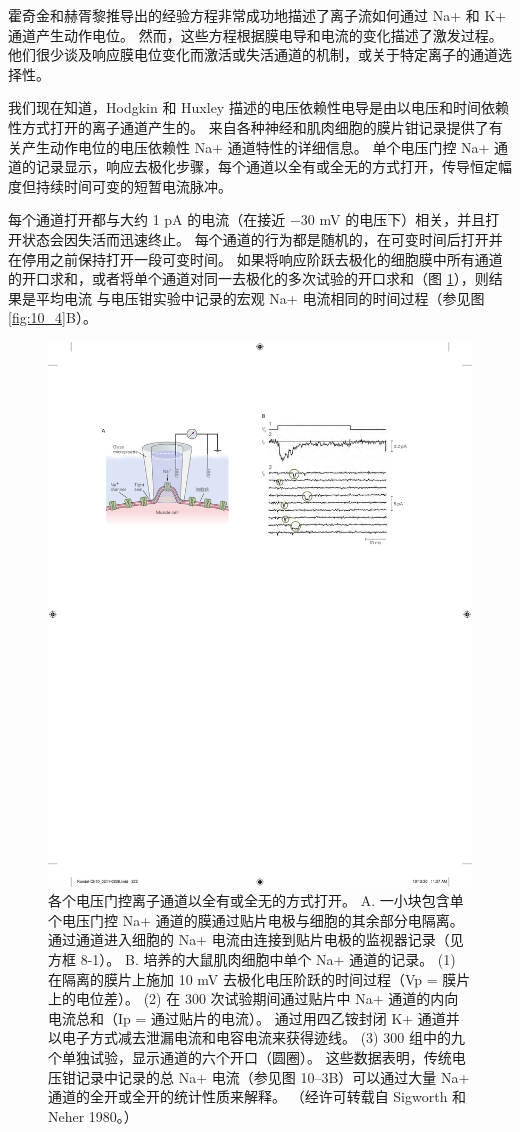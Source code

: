 霍奇金和赫胥黎推导出的经验方程非常成功地描述了离子流如何通过 Na+ 和 K+ 通道产生动作电位。 
然而，这些方程根据膜电导和电流的变化描述了激发过程。 
他们很少谈及响应膜电位变化而激活或失活通道的机制，或关于特定离子的通道选择性。


我们现在知道，Hodgkin 和 Huxley 描述的电压依赖性电导是由以电压和时间依赖性方式打开的离子通道产生的。 
来自各种神经和肌肉细胞的膜片钳记录提供了有关产生动作电位的电压依赖性 Na+ 通道特性的详细信息。 
单个电压门控 Na+ 通道的记录显示，响应去极化步骤，每个通道以全有或全无的方式打开，传导恒定幅度但持续时间可变的短暂电流脉冲。


每个通道打开都与大约 1 pA 的电流（在接近 −30 mV 的电压下）相关，并且打开状态会因失活而迅速终止。 
每个通道的行为都是随机的，在可变时间后打开并在停用之前保持打开一段可变时间。 
如果将响应阶跃去极化的细胞膜中所有通道的开口求和，或者将单个通道对同一去极化的多次试验的开口求和（图 \ref{fig:10_9}），则结果是平均电流 与电压钳实验中记录的宏观 Na+ 电流相同的时间过程（参见图 \ref{fig:10_4}B）。

\begin{figure}[htbp]
	\centering
	\includegraphics[width=0.5\linewidth]{chap10/fig_10_9}
	\caption{各个电压门控离子通道以全有或全无的方式打开。 A. 一小块包含单个电压门控 Na+ 通道的膜通过贴片电极与细胞的其余部分电隔离。 通过通道进入细胞的 Na+ 电流由连接到贴片电极的监视器记录（见方框 8-1）。 B. 培养的大鼠肌肉细胞中单个 Na+ 通道的记录。 (1) 在隔离的膜片上施加 10 mV 去极化电压阶跃的时间过程（Vp = 膜片上的电位差）。 (2) 在 300 次试验期间通过贴片中 Na+ 通道的内向电流总和（Ip = 通过贴片的电流）。 通过用四乙铵封闭 K+ 通道并以电子方式减去泄漏电流和电容电流来获得迹线。 (3) 300 组中的九个单独试验，显示通道的六个开口（圆圈）。 这些数据表明，传统电压钳记录中记录的总 Na+ 电流（参见图 10–3B）可以通过大量 Na+ 通道的全开或全开的统计性质来解释。 （经许可转载自 Sigworth 和 Neher 1980。）}
	\label{fig:10_9}
\end{figure}


